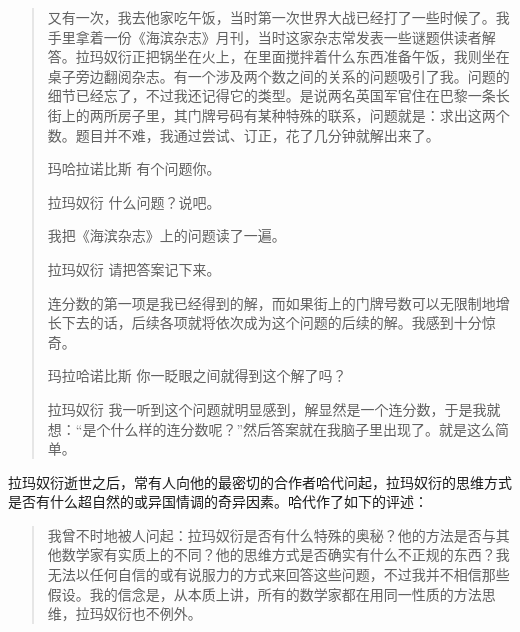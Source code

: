 \begin{quote}
又有一次，我去他家吃午饭，当时第一次世界大战已经打了一些时候了。我手里拿着一份《海滨杂志》月刊，当时这家杂志常发表一些谜题供读者解答。拉玛奴衍正把锅坐在火上，在里面搅拌着什么东西准备午饭，我则坐在桌子旁边翻阅杂志。有一个涉及两个数之间的关系的问题吸引了我。问题的细节已经忘了，不过我还记得它的类型。是说两名英国军官住在巴黎一条长街上的两所房子里，其门牌号码有某种特殊的联系，问题就是：求出这两个数。题目并不难，我通过尝试、订正，花了几分钟就解出来了。
\begin{dialogue}[topsep=\medskipamount]
\item[玛哈拉诺比斯]有个问题你。
\item[拉玛奴衍]什么问题？说吧。
\end{dialogue}

我把《海滨杂志》上的问题读了一遍。

\begin{dialogue}[topsep=\medskipamount]
\item[拉玛奴衍]请把答案记下来。
\end{dialogue}

连分数的第一项是我已经得到的解，而如果街上的门牌号数可以无限制地增长下去的话，后续各项就将依次成为这个问题的后续的解。我感到十分惊奇。

\begin{dialogue}[topsep=\medskipamount]
\item[玛拉哈诺比斯]你一眨眼之间就得到这个解了吗？
\item[拉玛奴衍]我一听到这个问题就明显感到，解显然是一个连分数，于是我就想：“是个什么样的连分数呢？”然后答案就在我脑子里出现了。就是这么简单。
\end{dialogue}
\end{quote}

拉玛奴衍逝世之后，常有人向他的最密切的合作者哈代问起，拉玛奴衍的思维方式是否有什么超自然的或异国情调的奇异因素。哈代作了如下的评述：

\begin{quote}
我曾不时地被人问起：拉玛奴衍是否有什么特殊的奥秘？他的方法是否与其他数学家有实质上的不同？他的思维方式是否确实有什么不正规的东西？我无法以任何自信的或有说服力的方式来回答这些问题，不过我并不相信那些假设。我的信念是，从本质上讲，所有的数学家都在用同一性质的方法思维，拉玛奴衍也不例外。
\end{quote}


